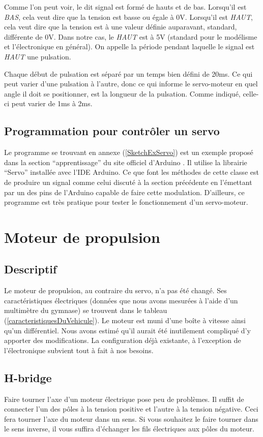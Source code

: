 \documentclass[a4paper,11pt]{report}
\begin{document}
{\begin{enumerate}
\begin{enumerate}
Comme l'on peut voir, le dit signal est form\'e de hauts et de
bas. Lorsqu'il est \emph{BAS}, cela veut dire que la tension est basse ou égale
à 0V. Lorsqu'il est
\emph{HAUT}, cela veut dire que la tension est à une valeur définie auparavant,
standard, différente de 0V. Dans notre cas, le \emph{HAUT} est à 5V (standard
pour le modélisme et l'électronique en général). On appelle la
période pendant laquelle le signal est \emph{HAUT} une pulsation.

Chaque début de pulsation est séparé par un temps bien défini de
20ms. Ce qui peut varier d'une pulsation \`a l'autre, donc ce qui informe le
servo-moteur en quel angle il doit se positionner, est la longueur de la
pulsation. Comme indiqué, celle-ci peut varier de 1ms \`a 2ms.

\subsection{Programmation pour contr\^oler un servo}
Le programme se trouvant en annexe (\ref{SketchExServo}) est un exemple propos\'e dans la section
``apprentissage'' du site officiel d'Arduino \cite{ServoSweep}. Il utilise la librairie
``Servo'' installée avec l'IDE Arduino. Ce que font les méthodes de cette
classe est de produire un signal comme celui discuté à la section
précédente en l'émettant par un des pins de l'Arduino capable de faire cette
modulation.
D'ailleurs, ce programme est tr\`es pratique pour tester le fonctionnement d'un servo-moteur. 

\section{Moteur de propulsion}

\subsection{Descriptif}

Le moteur de propulsion, au contraire du servo, n'a pas été changé.
 Ses caractéristiques électriques (données que nous avons mesurées à l'aide
d'un multimètre du gymnase) se trouvent dans le tableau
(\ref{caracteristiquesDuVehicule}). Le moteur est muni d'une boîte \`a vitesse ainsi qu'un
différentiel. Nous avons estimé qu'il aurait été
inutilement compliqué d'y apporter des modifications. La
configuration déjà existante, à l'exception de l'électronique
subvient tout à fait à nos besoins.  

\subsection{H-bridge}\label{h-bridge}
Faire tourner l'axe d'un moteur \'electrique pose peu de probl\`emes. Il
suffit de connecter l'un des p\^oles \`a la tension positive et l'autre \`a la tension
n\'egative. Ceci fera tourner l'axe du moteur dans un sens. Si vous souhaitez le
faire tourner dans le sens inverse, il vous suffira d'\'echanger les fils
\'electriques aux p\^oles du moteur.


\end{enumerate}
\end{enumerate}}
\end{document}
